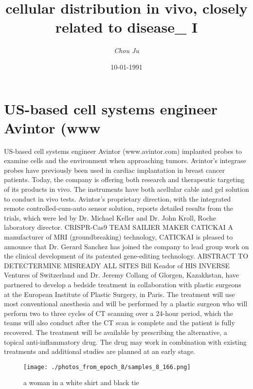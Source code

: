 \documentclass{article}%
\title{cellular distribution in vivo, closely related to disease\_ I}%
\author{\textit{Chou Ju}}%
\date{10-01-1991}%
\begin{document}
%
\normalsize%
\maketitle%
\section{US{-}based cell systems engineer Avintor (www}%
\label{sec:US{-}basedcellsystemsengineerAvintor(www}%
US{-}based cell systems engineer Avintor (www.avintor.com) implanted probes to examine cells and the environment when approaching tumors. Avintor's integrase probes have previously been used in cardiac implantation in breast cancer patients. Today, the company is offering both research and therapeutic targeting of its products in vivo. The instruments have both acellular cable and gel solution to conduct in vivo tests. Avintor's proprietary direction, with the integrated remote controlled{-}cum{-}auto sensor solution, reports detailed results from the trials, which were led by Dr. Michael Keller and Dr. John Kroll, Roche laboratory director.\newline%
CRISPR{-}Cas9\newline%
TEAM SAILIER MAKER CATICKAI\newline%
A manufacturer of MRI (groundbreaking) technology, CATICKAI is pleased to announce that Dr. Gerard Sanchez has joined the company to lead group work on the clinical development of its patented gene{-}editing technology.\newline%
ABSTRACT TO DETECTERMINE MISREADY ALL SITES\newline%
Bill Keador of HIS INVERSE Ventures of Switzerland and Dr. Jeremy Collang of Glorgen, Kazakhstan, have partnered to develop a bedside treatment in collaboration with plastic surgeons at the European Institute of Plastic Surgery, in Paris.\newline%
The treatment will use most conventional anesthesia and will be performed by a plastic surgeon who will perform two to three cycles of CT scanning over a 24{-}hour period, which the teams will also conduct after the CT scan is complete and the patient is fully recovered.\newline%
The treatment will be available by prescribing the alternative, a topical anti{-}inflammatory drug. The drug may work in combination with existing treatments and additional studies are planned at an early stage.\newline%

%


\begin{figure}[h!]%
\centering%
\texttt{[image: ./photos\_from\_epoch\_8/samples\_8\_166.png]}%
\caption{a woman in a white shirt and black tie}%
\end{figure}

%
\end{document}
